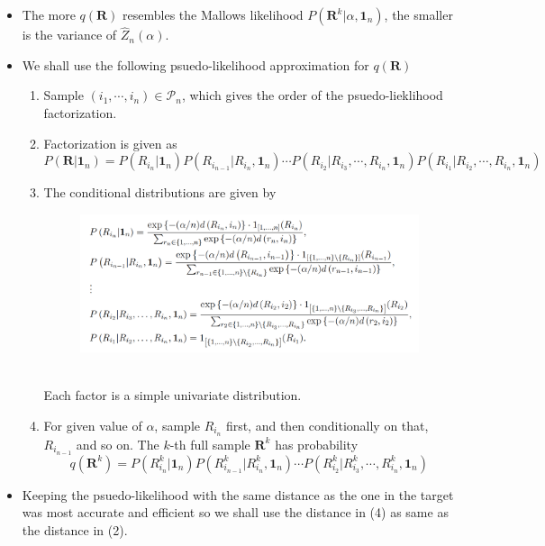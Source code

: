 \documentclass[12pt]{article}
\begin{document}
\begin{itemize}
\begin{itemize}
        \item The more $q(\mathbf{R})$ resembles the Mallows likelihood $P(\mathbf{R}^k | \alpha, \mathbf{1}_n)$, the smaller is the variance of $\hat{Z}_n(\alpha)$. 
        \item We shall use the following psuedo-likelihood approximation for $q(\mathbf{R})$
        \begin{enumerate}
            \item Sample $(i_1, \cdots, i_n)\in \mathcal{P}_n$, which gives the order of the psuedo-lieklihood factorization.
            \item Factorization is given as \begin{equation*}
                P(\mathbf{R}|\mathbf{1}_n)=P(R_{i_n}|\mathbf{1}_n)P(R_{i_{n-1}}|R_{i_n}, \mathbf{1}_n)\cdots P(R_{i_2}|R_{i_3}, \cdots, R_{i_n}, \mathbf{1}_n)P(R_{i_1}|R_{i_2}, \cdots, R_{i_n}, \mathbf{1}_n)
            \end{equation*}
            
            \item The conditional distributions are given by
            \begin{figure}[h]
                \includegraphics[width=15cm]{ConDist}
                \centering
            \end{figure}
            \\ Each factor is a simple univariate distribution. 
            \item For given value of $\alpha$, sample $R_{i_n}$ first, and then conditionally on that, $R_{i_{n-1}}$ and so on. The $k$-th full sample $\mathbf{R}^k$ has probability \begin{equation*}
                q(\mathbf{R}^k)=P(R_{i_n}^k|\mathbf{1}_n)P(R_{i_{n-1}}^k|R_{i_n}^k, \mathbf{1}_n)\cdots P(R_{i_2}^k|R_{i_3}^k, \cdots, R_{i_n}^k, \mathbf{1}_n)
            \end{equation*}       
        \end{enumerate}
        \item Keeping the psuedo-likelihood with the same distance as the one in the target was most accurate and efficient so we shall use the distance in (4) as same as the distance in (2).
    \end{itemize}
\end{itemize}
\end{document}
